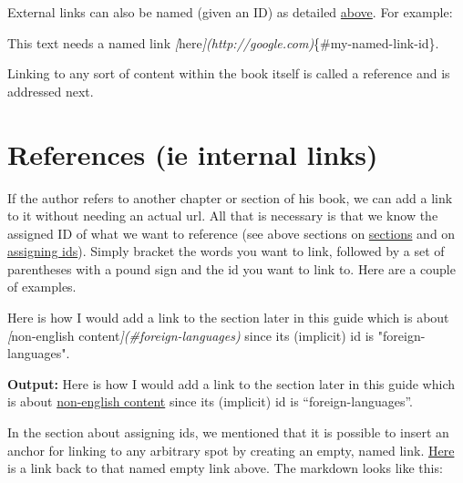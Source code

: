 \documentclass[
  english,
]{book}
\newenvironment{Shaded}{\begin{snugshade}}{\end{snugshade}}
\newcommand{\CommentTok}[1]{\textcolor[rgb]{0.56,0.35,0.01}{\textit{#1}}}
\newcommand{\NormalTok}[1]{#1}
\newcommand{\OtherTok}[1]{\textcolor[rgb]{0.56,0.35,0.01}{#1}}
\begin{document}
External links can also be named (given an ID) as detailed \protect\hyperlink{assigning-ids}{above}. For example:

\begin{Shaded}
\begin{Highlighting}[]
\NormalTok{This text needs a named link }\CommentTok{[}\OtherTok{here}\CommentTok{](http://google.com)}\NormalTok{\{\#my{-}named{-}link{-}id\}.}
\end{Highlighting}
\end{Shaded}

Linking to any sort of content within the book itself is called a reference and is addressed next.

\hypertarget{references}{%
\section{References (ie internal links)}\label{references}}

If the author refers to another chapter or section of his book, we can add a link to it without needing an actual url. All that is necessary is that we know the assigned ID of what we want to reference (see above sections on \protect\hyperlink{chapters-sections-and-more}{sections} and on \protect\hyperlink{assigning-ids}{assigning ids}). Simply bracket the words you want to link, followed by a set of parentheses with a pound sign and the id you want to link to. Here are a couple of examples.

\begin{Shaded}
\begin{Highlighting}[]
\NormalTok{Here is how I would add a link to the section later in this guide which is about }\CommentTok{[}\OtherTok{non{-}english content}\CommentTok{](\#foreign{-}languages)}\NormalTok{ since its (implicit) id is "foreign{-}languages".}
\end{Highlighting}
\end{Shaded}

\textbf{Output:}
Here is how I would add a link to the section later in this guide which is about \protect\hyperlink{foreign-languages}{non-english content} since its (implicit) id is ``foreign-languages''.

In the section about assigning ids, we mentioned that it is possible to insert an anchor for linking to any arbitrary spot by creating an empty, named link. \protect\hyperlink{namedEmptyLink}{Here} is a link back to that named empty link above. The markdown looks like this:
\end{document}
